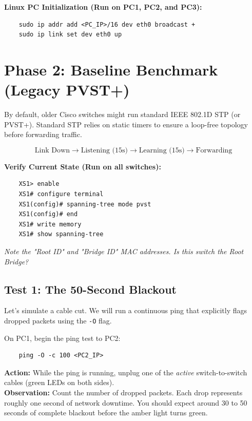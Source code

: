 \documentclass[11pt]{article}
\begin{document}
\noindent\textbf{Linux PC Initialization (Run on PC1, PC2, and PC3):}
\begin{verbatim}
    sudo ip addr add <PC_IP>/16 dev eth0 broadcast +
    sudo ip link set dev eth0 up
\end{verbatim}

\vspace{0.5em}
\noindent {}

\section{Phase 2: Baseline Benchmark (Legacy PVST+)}
By default, older Cisco switches might run standard IEEE 802.1D STP (or PVST+). Standard STP relies on static timers to ensure a loop-free topology before forwarding traffic.

\[
\text{Link Down} \rightarrow \text{Listening (15s)} \rightarrow \text{Learning (15s)} \rightarrow \text{Forwarding}
\]

\noindent{}

\vspace{1em}
\noindent\textbf{Verify Current State (Run on all switches):}
\begin{verbatim}
    XS1> enable
    XS1# configure terminal
    XS1(config)# spanning-tree mode pvst
    XS1(config)# end
    XS1# write memory
    XS1# show spanning-tree
\end{verbatim}
\textit{Note the "Root ID" and "Bridge ID" MAC addresses. Is this switch the Root Bridge?}

\subsection*{Test 1: The 50-Second Blackout}
Let's simulate a cable cut. We will run a continuous ping that explicitly flags dropped packets using the \texttt{-O} flag.

\noindent On PC1, begin the ping test to PC2:
\begin{verbatim}
    ping -O -c 100 <PC2_IP>
\end{verbatim}
\textbf{Action:} While the ping is running, unplug one of the \textit{active} switch-to-switch cables (green LEDs on both sides). \\
\textbf{Observation:} Count the number of dropped packets. Each drop represents roughly one second of network downtime. You should expect around 30 to 50 seconds of complete blackout before the amber light turns green.
\end{document}
